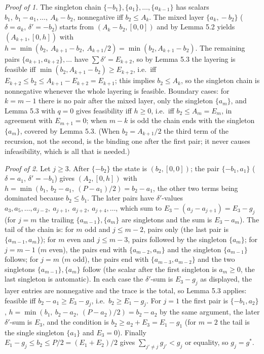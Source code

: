 \documentclass[
  11pt,
  a4paper,
]{article}
\begin{document}
\emph{Proof of 1.} The singleton chain
\(\{-b_1\},\allowbreak{}\{a_1\},\allowbreak{}\dots,\allowbreak{}\{a_{k-1}\}\) has scalars
\(b_1,\allowbreak{}\ b_1-a_1,\allowbreak{}\dots,\allowbreak{}\ A_k-b_2\), nonnegative iff \(b_2\le A_k\). The
mixed layer \(\{a_k,\allowbreak{}-b_2\}\) (\(\delta=a_k\), \(\delta'=-b_2\)) starts
from \((A_k-b_2,\allowbreak{}[0,\allowbreak{}0])\) and by Lemma 5.2 yields \((A_{k+1},\allowbreak{}[0,\allowbreak{}h])\)
with \(h=\min(b_2,\allowbreak{}\ A_{k+1}-b_2,\allowbreak{}\ A_{k+1}/2)=\min(b_2,\allowbreak{}A_{k+1}-b_2)\).
The remaining pairs \(\{a_{k+1},\allowbreak{}a_{k+2}\},\allowbreak{}\dots\) have
\(\sum\delta'=E_{k+2}\), so by Lemma 5.3 the layering is feasible iff
\(\min(b_2,\allowbreak{}A_{k+1}-b_2)\ge E_{k+2}\), i.e.~iff
\(E_{k+2}\le b_2\le A_{k+1}-E_{k+2}=E_{k+1}\); this implies
\(b_2\le A_k\), so the singleton chain is nonnegative whenever the whole
layering is feasible. Boundary cases: for \(k=m-1\) there is no pair
after the mixed layer, only the singleton \(\{a_m\}\), and Lemma 5.3
with \(q=0\) gives feasibility iff \(h\ge0\), i.e.~iff
\(b_2\le A_m=E_m\), in agreement with \(E_{m+1}=0\); when \(m-k\) is odd
the chain ends with the singleton \(\{a_m\}\), covered by Lemma 5.3.
(When \(b_2=A_{k+1}/2\) the third term of the recursion, not the second,
is the binding one after the first pair; it never causes infeasibility,
which is all that is needed.)

\emph{Proof of 2.} Let \(j\ge3\). After \(\{-b_2\}\) the state is
\((b_2,\allowbreak{}[0,\allowbreak{}0])\); the pair \(\{-b_1,\allowbreak{}a_1\}\) (\(\delta=a_1\),
\(\delta'=-b_1\)) gives \((A_2,\allowbreak{}[0,\allowbreak{}h])\) with
\(h=\min(b_1,\allowbreak{}\ b_2-a_1,\allowbreak{}\ (P-a_1)/2)=b_2-a_1\), the other two terms being
dominated because \(b_2\le b_1\). The later pairs have
\(\delta'\)-values
\(a_3,\allowbreak{}a_5,\allowbreak{}\dots,\allowbreak{}a_{j-2},\allowbreak{}\ a_{j+1},\allowbreak{}\ a_{j+2},\allowbreak{}\ a_{j+4},\allowbreak{}\dots\), which sum
to \(E_3-(a_j-a_{j+1})=E_3-g_j\) (for \(j=m\) the trailing
\(\{a_{m-1}\},\allowbreak{}\{a_m\}\) are singletons and the sum is \(E_3-a_m\)). The
tail of the chain is: for \(m\) odd and \(j\le m-2\), pairs only (the
last pair is \(\{a_{m-1},\allowbreak{}a_m\}\)); for \(m\) even and \(j\le m-3\),
pairs followed by the singleton \(\{a_m\}\); for \(j=m-1\) (\(m\) even),
the pairs end with \(\{a_{m-2},\allowbreak{}a_m\}\) and the singleton \(\{a_{m-1}\}\)
follows; for \(j=m\) (\(m\) odd), the pairs end with
\(\{a_{m-3},\allowbreak{}a_{m-2}\}\) and the two singletons \(\{a_{m-1}\},\allowbreak{}\{a_m\}\)
follow (the scalar after the first singleton is \(a_m\ge0\), the last
singleton is automatic). In each case the \(\delta'\)-sum is \(E_3-g_j\)
as displayed, the layer entries are nonnegative and the trace is the
total, so Lemma 5.3 applies: feasible iff \(b_2-a_1\ge E_3-g_j\),
i.e.~\(b_2\ge E_1-g_j\). For \(j=1\) the first pair is \(\{-b_1,\allowbreak{}a_2\}\),
\(h=\min(b_1,\allowbreak{}\ b_2-a_2,\allowbreak{}\ (P-a_2)/2)=b_2-a_2\) by the same argument, the
later \(\delta'\)-sum is \(E_3\), and the condition is
\(b_2\ge a_2+E_3=E_1-g_1\) (for \(m=2\) the tail is the single singleton
\(\{a_1\}\) and \(E_3=0\)). Finally
\(E_1-g_j\le b_2\le P/2=(E_1+E_2)/2\) gives \(\sum_{j'\ne j}g_{j'}<g_j\)
or equality, so \(g_j=g^*\).
\end{document}
